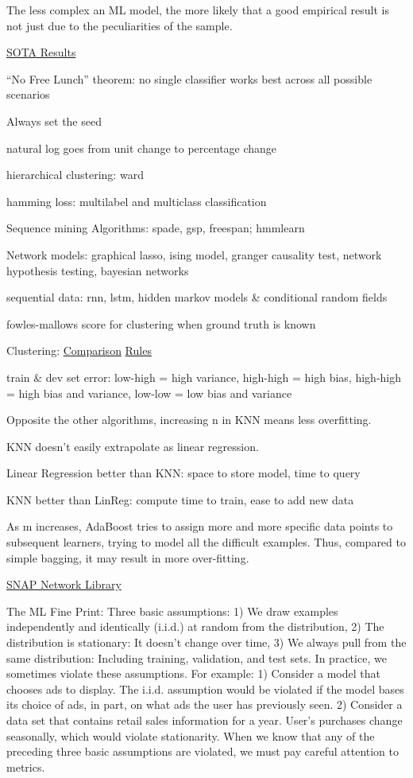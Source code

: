 \documentclass[]{book}
\begin{document}
The less complex an ML model, the more likely that a good empirical result is not just due to the peculiarities of the sample.

\href{https://paperswithcode.com/sota}{SOTA Results}

``No Free Lunch'' theorem: no single classifier works best across all possible scenarios

Always set the seed

natural log goes from unit change to percentage change

hierarchical clustering: ward

hamming loss: multilabel and multiclass classification

Sequence mining Algorithms: spade, gsp, freespan; hmmlearn

Network models: graphical lasso, ising model, granger causality test, network hypothesis testing, bayesian networks

sequential data: rnn, lstm, hidden markov models \& conditional random fields

fowles-mallows score for clustering when ground truth is known

Clustering: \href{http://scikit-learn.org/stable/modules/clustering.html\#clustering}{Comparison} \href{https://twitter.com/thomaswdinsmore/status/965223193043718145}{Rules}

train \& dev set error: low-high = high variance, high-high = high bias, high-high = high bias and variance, low-low = low bias and variance

Opposite the other algorithms, increasing n in KNN means less overfitting.

KNN doesn't easily extrapolate as linear regression.

Linear Regression better than KNN: space to store model, time to query

KNN better than LinReg: compute time to train, ease to add new data

As m increases, AdaBoost tries to assign more and more specific data points to subsequent learners, trying to model all the difficult examples. Thus, compared to simple bagging, it may result in more over-fitting.

\href{https://snap.stanford.edu/snappy/index.html}{SNAP Network Library}

The ML Fine Print: Three basic assumptions: 1) We draw examples independently and identically (i.i.d.) at random from the distribution, 2) The distribution is stationary: It doesn't change over time, 3) We always pull from the same distribution: Including training, validation, and test sets. In practice, we sometimes violate these assumptions. For example: 1) Consider a model that chooses ads to display. The i.i.d. assumption would be violated if the model bases its choice of ads, in part, on what ads the user has previously seen. 2) Consider a data set that contains retail sales information for a year. User's purchases change seasonally, which would violate stationarity. When we know that any of the preceding three basic assumptions are violated, we must pay careful attention to metrics.
\end{document}
